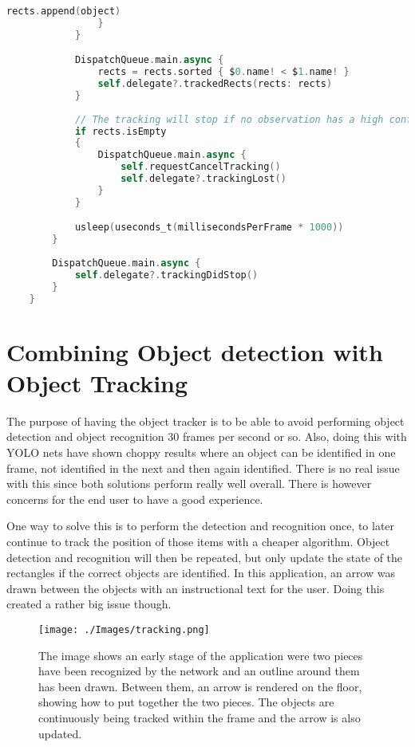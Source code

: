 \begin{lstlisting}[language=swift]
                    rects.append(object)
                }
            }

            DispatchQueue.main.async {
                rects = rects.sorted { $0.name! < $1.name! }
                self.delegate?.trackedRects(rects: rects)
            }
            
            // The tracking will stop if no observation has a high confidence value
            if rects.isEmpty
            {
                DispatchQueue.main.async {
                    self.requestCancelTracking()
                    self.delegate?.trackingLost()
                }
            }

            usleep(useconds_t(millisecondsPerFrame * 1000))
        }
        
        DispatchQueue.main.async {
            self.delegate?.trackingDidStop()
        }
    }
\end{lstlisting}


\section{Combining Object detection with Object Tracking}
The purpose of having the object tracker is to be able to avoid performing object detection and object recognition 30 frames per second or so. Also, doing this with YOLO nets have shown choppy results where an object can be identified in one frame, not identified in the next and then again identified.
There is no real issue with this since both solutions perform really well overall. There is however concerns for the end user to have a good experience.

One way to solve this is to perform the detection and recognition once, to later continue to track the position of those items with a cheaper algorithm.
Object detection and recognition will then be repeated, but only update the state of the rectangles if the correct objects are identified.
In this application, an arrow was drawn between the objects with an instructional text for the user. Doing this created a rather big issue though.

\begin{figure}[!hbtp]
\begin{center}
\texttt{[image: ./Images/tracking.png]}
\caption{The image shows an early stage of the application were two pieces have been recognized by the network and an outline around them has been drawn. Between them, an arrow is rendered on the floor, showing how to put together the two pieces. The objects are continuously being tracked within the frame and the arrow is also updated.}
\label{fig:tracking}
\end{center}
\end{figure}

